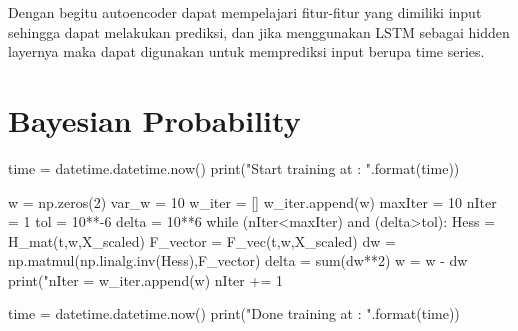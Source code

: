 Dengan begitu autoencoder dapat mempelajari fitur-fitur yang dimiliki input sehingga dapat melakukan prediksi, dan jika menggunakan LSTM sebagai hidden layernya maka dapat digunakan untuk memprediksi input berupa time series.

\section{Bayesian Probability}

\begin{python}
    time = datetime.datetime.now()
    print("Start training at : {}".format(time))
    
    w = np.zeros(2)
    var_w = 10
    w_iter = []
    w_iter.append(w)
    maxIter = 10
    nIter = 1
    tol = 10**-6
    delta = 10**6
    while (nIter<maxIter) and (delta>tol):
        Hess = H_mat(t,w,X_scaled)
        F_vector = F_vec(t,w,X_scaled)
        dw = np.matmul(np.linalg.inv(Hess),F_vector)
        delta = sum(dw**2)
        w = w - dw
        print("nIter = %
        w_iter.append(w)
        nIter += 1
    
    time = datetime.datetime.now()
    print("Done training at : {}".format(time))

\end{python}
